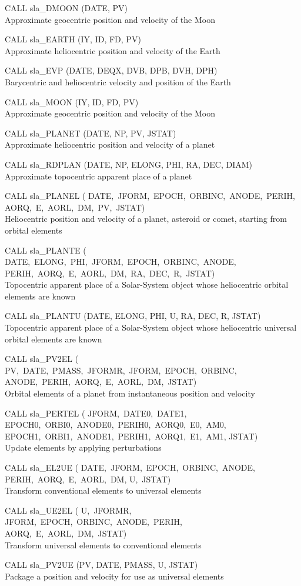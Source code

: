 \documentclass[11pt,twoside]{article}
\newcommand{\callhead}[1]{\goodbreak\vspace{\bigskipamount}{\large\bf{#1}}}
\newenvironment{callset}{\begin{list}{}{\setlength{\leftmargin}{2cm}
                             \setlength{\parsep}{\smallskipamount}}}{\end{list}}
\newcommand{\subp}[1]{\item\hspace{-1cm}#1\\}
\begin{document}
\callhead{Ephemerides}
\begin{callset}
\subp{CALL sla\_DMOON (DATE, PV)}
   Approximate geocentric position and velocity of the Moon
\subp{CALL sla\_EARTH (IY, ID, FD, PV)}
   Approximate heliocentric position and velocity of the Earth
\subp{CALL sla\_EVP (DATE, DEQX, DVB, DPB, DVH, DPH)}
   Barycentric and heliocentric velocity and position of the Earth
\subp{CALL sla\_MOON (IY, ID, FD, PV)}
   Approximate geocentric position and velocity of the Moon
\subp{CALL sla\_PLANET (DATE, NP, PV, JSTAT)}
   Approximate heliocentric position and velocity of a planet
\subp{CALL sla\_RDPLAN (DATE, NP, ELONG, PHI, RA, DEC, DIAM)}
   Approximate topocentric apparent place of a planet
\subp{CALL sla\_PLANEL (\vtop
                       {\hbox{DATE, JFORM, EPOCH, ORBINC, ANODE, PERIH,}
                      \hbox{AORQ, E, AORL, DM, PV, JSTAT)}}}
   Heliocentric position and velocity of a planet, asteroid or
   comet, starting from orbital elements
\subp{CALL sla\_PLANTE (\vtop
                       {\hbox{DATE, ELONG, PHI, JFORM, EPOCH, ORBINC, ANODE,}
                      \hbox{PERIH, AORQ, E, AORL, DM, RA, DEC, R, JSTAT)}}}
   Topocentric apparent place of a Solar-System object whose
   heliocentric orbital elements are known
\subp{CALL sla\_PLANTU (DATE, ELONG, PHI, U, RA, DEC, R, JSTAT)}
   Topocentric apparent place of a Solar-System object whose
   heliocentric universal orbital elements are known
\subp{CALL sla\_PV2EL (\vtop
                      {\hbox{PV, DATE, PMASS, JFORMR, JFORM, EPOCH, ORBINC,}
                     \hbox{ANODE, PERIH, AORQ, E, AORL, DM, JSTAT)}}}
   Orbital elements of a planet from instantaneous position and velocity
\subp{CALL sla\_PERTEL (\vtop
                       {\hbox{JFORM, DATE0, DATE1,}
                     \hbox{EPOCH0, ORBI0, ANODE0, PERIH0, AORQ0, E0, AM0,}
                     \hbox{EPOCH1, ORBI1, ANODE1, PERIH1, AORQ1, E1, AM1,}
                     \hbox{JSTAT)}}}
   Update elements by applying perturbations
\subp{CALL sla\_EL2UE (\vtop
                      {\hbox{DATE, JFORM, EPOCH, ORBINC, ANODE,}
                     \hbox{PERIH, AORQ, E, AORL, DM,}
                     \hbox{U, JSTAT)}}}
   Transform conventional elements to universal elements
\subp{CALL sla\_UE2EL (\vtop
                      {\hbox{U, JFORMR,}
                     \hbox{JFORM, EPOCH, ORBINC, ANODE, PERIH,}
                     \hbox{AORQ, E, AORL, DM, JSTAT)}}}
   Transform universal elements to conventional elements
\subp{CALL sla\_PV2UE (PV, DATE, PMASS, U, JSTAT)}
   Package a position and velocity for use as universal elements

\end{callset}
\end{document}
